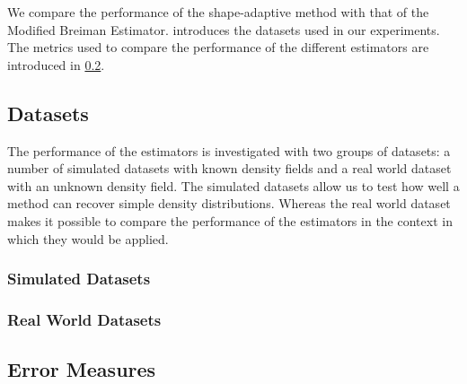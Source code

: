 We compare the performance of the shape-adaptive method with that of the Modified Breiman Estimator.  introduces the datasets used in our experiments. The metrics used to compare the performance of the different estimators are introduced in \cref{ss:3:errorMeasures}.

\subsection{Datasets}
\label{ss:3:datasets}
	The performance of the estimators is investigated with two groups of datasets: a number of simulated datasets with known density fields and a real world dataset with an unknown density field. The simulated datasets allow us to test how well a method can recover simple density distributions. Whereas the real world dataset makes it possible to compare the performance of the estimators in the context in which they would be applied. 

	\subsubsection*{Simulated Datasets}
					

	\subsubsection*{Real World Datasets}

\subsection{Error Measures}
\label{ss:3:errorMeasures}

